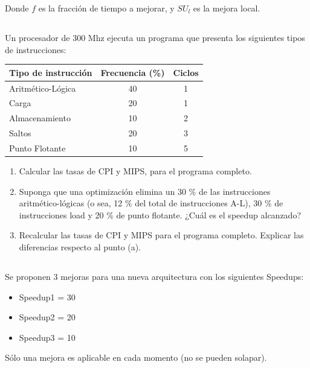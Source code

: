 Donde $f$ es la fracción de tiempo a mejorar, y $SU_l$ es la mejora local.

\subsection{}

Un procesador de 300 Mhz ejecuta un programa que presenta los siguientes tipos de instrucciones:

\begin{table}[h!]
\begin{tabular}{|l|c|c|}
\hline
 Tipo de instrucción & Frecuencia (\%)  &  Ciclos  \\ \hline
 Aritmético-Lógica & 40  &  1  \\ \hline
 Carga & 20 & 1 \\ \hline
 Almacenamiento & 10  & 2  \\ \hline
 Saltos & 20  & 3 \\ \hline
 Punto Flotante & 10 & 5  \\ \hline
\end{tabular}
\end{table}

\begin{enumerate}[label=\alph*)]
 \item Calcular las tasas de CPI y MIPS, para el programa completo.
 \item Suponga que una optimización elimina un 30 \% de las instrucciones aritmético-lógicas (o sea, 12 \% del total de instrucciones A-L), 30 \% de instrucciones load y 20 \% de punto flotante. ¿Cuál es el speedup alcanzado?
 \item Recalcular las tasas de CPI y MIPS para el programa completo. Explicar las diferencias respecto al punto (a).
\end{enumerate}

\subsection{}
Se proponen 3 mejoras para una nueva arquitectura con los siguientes Speedups:
\begin{itemize}
\item Speedup1 = 30
\item Speedup2 = 20
\item Speedup3 = 10
\end{itemize}

Sólo una mejora es aplicable en cada momento (no se pueden solapar).

